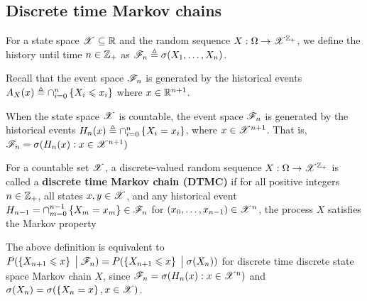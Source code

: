 \documentclass[letterpaper,10pt,english]{article}
\begin{document}
\subsection{Discrete time Markov chains}
\begin{defn}
For a state space $\mathscr{X} \subseteq \mathbb{R}$ and the random sequence $X: \Omega \to \mathscr{X}^{\mathbb{Z}_+}$, 
we define the history until time $n \in \mathbb{Z}_+$ as $\mathscr{F}_n \triangleq \sigma(X_1, \dots, X_n)$. 
\end{defn} 
\begin{rem} 
Recall that the event space $\mathscr{F}_n$ is generated by the historical events $A_X(x) \triangleq \cap_{i=0}^n\left\{X_i \leqslant x_i\right\}$ where $x \in \mathbb{R}^{n+1}$.
\end{rem}
\begin{rem} 
When the state space $\mathscr{X}$ is countable, the event space $\mathscr{F}_n$ is generated by the historical events $H_n(x) \triangleq \cap_{i=0}^n\left\{X_i = x_i\right\}$, where $x \in \mathscr{X}^{n+1}$. 
That is, $\mathscr{F}_n = \sigma(H_n(x):x \in \mathscr{X}^{n+1})$
\end{rem}
\begin{defn} %
For a countable set $\mathscr{X}$, a discrete-valued random sequence $X: \Omega \to \mathscr{X}^{\mathbb{Z}_+}$ is called a \textbf{discrete time Markov chain (DTMC)} 
if for all positive integers $n \in \mathbb{Z}_+$, all states $x,y \in \mathscr{X}$, 
and any historical event $H_{n-1} = \cap_{m=0}^{n-1}\left\{X_m = x_m\right\} \in \mathscr{F}_n$ for $(x_0, \dots, x_{n-1}) \in \mathscr{X}^{n}$, 
the process $X$ satisfies the Markov property 
\end{defn}
\begin{rem} 
The above definition is equivalent to $P(\left\{X_{n+1} \leqslant x\right\}\; \big\vert \; \mathscr{F}_n) = P(\left\{X_{n+1} \leqslant x\right\}\; \big\vert \; \sigma(X_n))$ for discrete time discrete state space Markov chain $X$,   
since $\mathscr{F}_n = \sigma(H_n(x): x \in \mathscr{X}^n)$ and $\sigma(X_n) = \sigma(\left\{X_n = x\right\}, x \in \mathscr{X})$. 
\end{rem}
\end{document}
